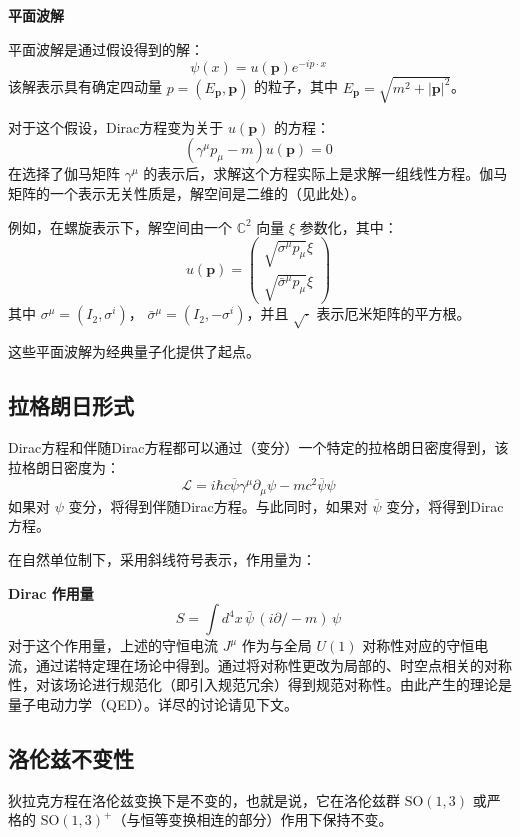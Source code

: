 \textbf{平面波解}

平面波解是通过假设得到的解：
\[
\psi (x) = u(\mathbf {p} )e^{-ip\cdot x}~
\]
该解表示具有确定四动量 \( p = (E_{\mathbf {p} }, \mathbf {p}) \) 的粒子，其中 \( E_{\mathbf {p}} = \sqrt{m^{2} + |\mathbf{p}|^{2}} \)。

对于这个假设，Dirac方程变为关于 \( u(\mathbf {p}) \) 的方程：
\[
(\gamma^{\mu} p_{\mu} - m) u(\mathbf {p}) = 0~
\]
在选择了伽马矩阵 \( \gamma^\mu \) 的表示后，求解这个方程实际上是求解一组线性方程。伽马矩阵的一个表示无关性质是，解空间是二维的（见此处）。

例如，在螺旋表示下，解空间由一个 \( \mathbb{C}^2 \) 向量 \( \xi \) 参数化，其中：
\[
u(\mathbf {p}) = \begin{pmatrix} {\sqrt{\sigma^{\mu} p_{\mu}}} \xi \\ {\sqrt{\bar{\sigma}^{\mu} p_{\mu}}} \xi \end{pmatrix}~
\]
其中 \( \sigma^{\mu} = (I_2, \sigma^i) \)， \( \bar{\sigma}^{\mu} = (I_2, -\sigma^i) \)，并且 \( \sqrt{\cdot} \) 表示厄米矩阵的平方根。

这些平面波解为经典量子化提供了起点。

\subsection{拉格朗日形式}

Dirac方程和伴随Dirac方程都可以通过（变分）一个特定的拉格朗日密度得到，该拉格朗日密度为：
\[
\mathcal{L} = i\hbar c \overline{\psi} \gamma^{\mu} \partial_{\mu} \psi - mc^2 \overline{\psi} \psi~
\]
如果对 \( \psi \) 变分，将得到伴随Dirac方程。与此同时，如果对 \( \overline{\psi} \) 变分，将得到Dirac方程。

在自然单位制下，采用斜线符号表示，作用量为：

\textbf{Dirac 作用量}
\[
S = \int d^4 x \, {\bar {\psi}} \, (i \partial \!\!\! / - m) \, \psi~
\]
对于这个作用量，上述的守恒电流 \( J^{\mu} \) 作为与全局 \( U(1) \) 对称性对应的守恒电流，通过诺特定理在场论中得到。通过将对称性更改为局部的、时空点相关的对称性，对该场论进行规范化（即引入规范冗余）得到规范对称性。由此产生的理论是量子电动力学（QED）。详尽的讨论请见下文。
\subsection{洛伦兹不变性}  
狄拉克方程在洛伦兹变换下是不变的，也就是说，它在洛伦兹群 \( \text{SO}(1,3) \) 或严格的 \( \text{SO}(1,3)^{+} \)（与恒等变换相连的部分）作用下保持不变。

